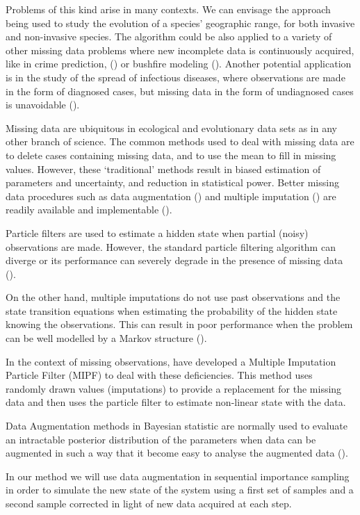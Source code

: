 Problems of this kind arise in many contexts. We can envisage the approach being used to study the evolution of a species' geographic range, for both invasive and non-invasive species. The algorithm could be also applied to a variety of other missing data problems where new incomplete data is continuously acquired, like in crime prediction, (\cite{Malathy}) or bushfire modeling (\cite{Beer}). Another potential application is in the study of the spread of infectious diseases, where observations are made in the form of diagnosed cases, but missing data in the form of undiagnosed cases is unavoidable (\cite{O'Neill}). 

Missing data are ubiquitous in ecological and evolutionary data sets as in any other branch of science. The common methods used to deal with missing data are to delete cases containing missing data, and to use the mean to fill in missing values. However, these ‘traditional’ methods result in biased estimation of parameters and uncertainty, and reduction in statistical power. Better missing data procedures such as data augmentation (\cite{Tanner}) and multiple imputation (\cite{RubinMI}) are readily available and implementable (\cite{Nakagawa}).

Particle filters are used to estimate a hidden state when partial (noisy) observations are made. However, the standard particle filtering algorithm can diverge or its performance can severely degrade in the presence of missing data (\cite{Zhang}).

On the other hand, multiple imputations do not use past observations and the state transition equations when estimating the probability of the hidden state knowing the observations. This can result in poor performance when the problem can be well modelled by a Markov structure (\cite{Zhang}).

In the context of missing observations, \cite{Zhang} have developed a Multiple Imputation Particle Filter (MIPF) to deal with these deficiencies. This method uses randomly drawn values (imputations) to provide a replacement for the missing data and then uses the particle filter to estimate non-linear state with the data.

Data Augmentation methods in Bayesian statistic are normally used to evaluate an intractable posterior distribution of the parameters when data can be augmented in such a way that it become easy to analyse the augmented data (\cite{Tanner}).

In our method we will use data augmentation in sequential importance sampling in order to simulate the new state of the system using a first set of samples and a second sample corrected in light of new data acquired at each step.

